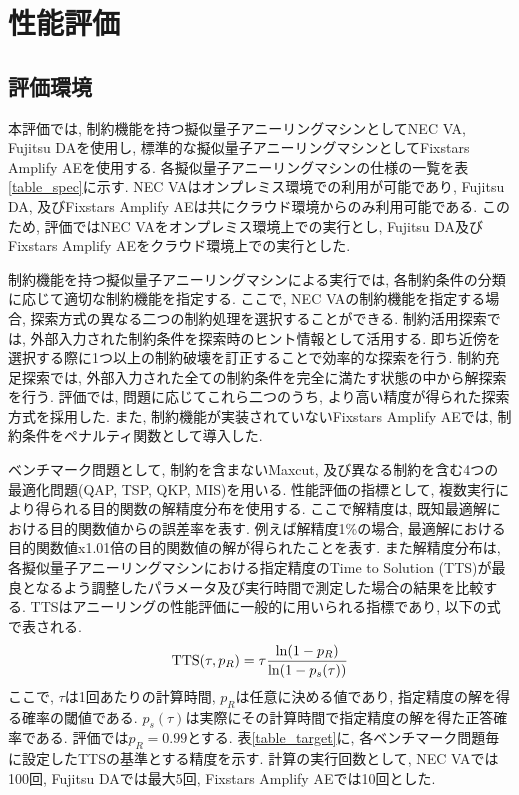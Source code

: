 \documentclass[submit,techrep,noauthor]{ipsj}
\begin{document}
\section{性能評価}

\subsection{評価環境}
本評価では, 制約機能を持つ擬似量子アニーリングマシンとしてNEC VA, Fujitsu DAを使用し, 標準的な擬似量子アニーリングマシンとしてFixstars Amplify AEを使用する. 各擬似量子アニーリングマシンの仕様の一覧を表\ref{table_spec}に示す. NEC VAはオンプレミス環境での利用が可能であり, Fujitsu DA, 及びFixstars Amplify AEは共にクラウド環境からのみ利用可能である. このため, 評価ではNEC VAをオンプレミス環境上での実行とし, Fujitsu DA及びFixstars Amplify AEをクラウド環境上での実行とした. 

制約機能を持つ擬似量子アニーリングマシンによる実行では, 各制約条件の分類に応じて適切な制約機能を指定する. ここで, NEC VAの制約機能を指定する場合, 探索方式の異なる二つの制約処理を選択することができる. 制約活用探索では, 外部入力された制約条件を探索時のヒント情報として活用する. 即ち近傍を選択する際に1つ以上の制約破壊を訂正することで効率的な探索を行う. 制約充足探索では, 外部入力された全ての制約条件を完全に満たす状態の中から解探索を行う. 評価では, 問題に応じてこれら二つのうち, より高い精度が得られた探索方式を採用した. また, 制約機能が実装されていないFixstars Amplify AEでは, 制約条件をペナルティ関数として導入した. 

ベンチマーク問題として, 制約を含まないMaxcut, 及び異なる制約を含む4つの最適化問題(QAP, TSP, QKP, MIS)を用いる. 性能評価の指標として, 複数実行により得られる目的関数の解精度分布を使用する. ここで解精度は, 既知最適解における目的関数値からの誤差率を表す. 例えば解精度1\%の場合, 最適解における目的関数値x1.01倍の目的関数値の解が得られたことを表す. また解精度分布は, 各擬似量子アニーリングマシンにおける指定精度のTime to Solution (TTS)が最良となるよう調整したパラメータ及び実行時間で測定した場合の結果を比較する. TTSはアニーリングの性能評価に一般的に用いられる指標であり, 以下の式で表される.
\begin{equation}
{\rm{TTS}}(\tau, p_{R}) = \tau\frac{{\rm{ln}}(1-p_{R})}{{\rm{ln}}(1-p_{s}(\tau))} \label{tts_def}
\end{equation}
ここで, $\tau$は1回あたりの計算時間, $p_{R}$は任意に決める値であり, 指定精度の解を得る確率の閾値である. $p_{s}(\tau)$は実際にその計算時間で指定精度の解を得た正答確率である. 評価では$p_{R}=0.99$とする. 表\ref{table_target}に, 各ベンチマーク問題毎に設定したTTSの基準とする精度を示す. 計算の実行回数として, NEC VAでは100回, Fujitsu DAでは最大5回, Fixstars Amplify AEでは10回とした.
\end{document}
